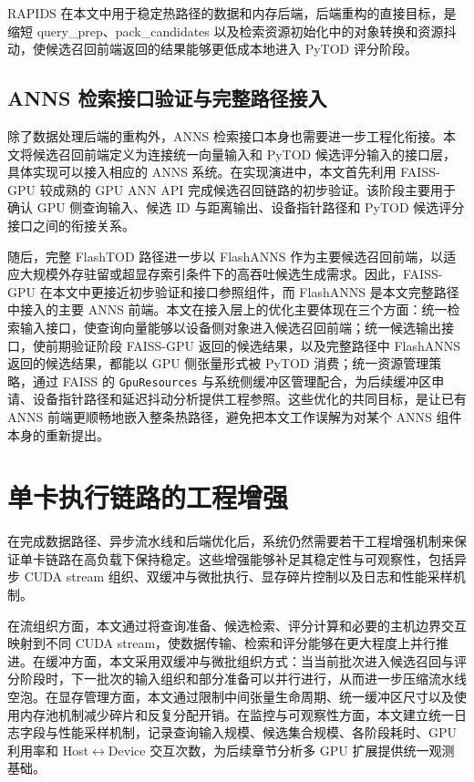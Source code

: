 RAPIDS 在本文中用于稳定热路径的数据和内存后端，后端重构的直接目标，是缩短 query\_prep、pack\_candidates 以及检索资源初始化中的对象转换和资源抖动，使候选召回前端返回的结果能够更低成本地进入 PyTOD 评分阶段。

\subsection{ANNS 检索接口验证与完整路径接入}

除了数据处理后端的重构外，ANNS 检索接口本身也需要进一步工程化衔接。本文将候选召回前端定义为连接统一向量输入和 PyTOD 候选评分输入的接口层，具体实现可以接入相应的 ANNS 系统。在实现演进中，本文首先利用 FAISS-GPU 较成熟的 GPU ANN API 完成候选召回链路的初步验证。该阶段主要用于确认 GPU 侧查询输入、候选 ID 与距离输出、设备指针路径和 PyTOD 候选评分接口之间的衔接关系。

随后，完整 FlashTOD 路径进一步以 FlashANNS 作为主要候选召回前端，以适应大规模外存驻留或超显存索引条件下的高吞吐候选生成需求。因此，FAISS-GPU 在本文中更接近初步验证和接口参照组件，而 FlashANNS 是本文完整路径中接入的主要 ANNS 前端。本文在接入层上的优化主要体现在三个方面：统一检索输入接口，使查询向量能够以设备侧对象进入候选召回前端；统一候选输出接口，使前期验证阶段 FAISS-GPU 返回的候选结果，以及完整路径中 FlashANNS 返回的候选结果，都能以 GPU 侧张量形式被 PyTOD 消费；统一资源管理策略，通过 FAISS 的 \texttt{GpuResources} 与系统侧缓冲区管理配合，为后续缓冲区申请、设备指针路径和延迟抖动分析提供工程参照\citep{faiss_gpu_wiki}。这些优化的共同目标，是让已有 ANNS 前端更顺畅地嵌入整条热路径，避免把本文工作误解为对某个 ANNS 组件本身的重新提出。

\section{单卡执行链路的工程增强}

在完成数据路径、异步流水线和后端优化后，系统仍然需要若干工程增强机制来保证单卡链路在高负载下保持稳定。这些增强能够补足其稳定性与可观察性，包括异步 CUDA stream 组织、双缓冲与微批执行、显存碎片控制以及日志和性能采样机制。

在流组织方面，本文通过将查询准备、候选检索、评分计算和必要的主机边界交互映射到不同 CUDA stream，使数据传输、检索和评分能够在更大程度上并行推进。在缓冲方面，本文采用双缓冲与微批组织方式：当当前批次进入候选召回与评分阶段时，下一批次的输入组织和部分准备可以并行进行，从而进一步压缩流水线空泡。在显存管理方面，本文通过限制中间张量生命周期、统一缓冲区尺寸以及使用内存池机制减少碎片和反复分配开销。在监控与可观察性方面，本文建立统一日志字段与性能采样机制，记录查询输入规模、候选集合规模、各阶段耗时、GPU 利用率和 Host$\leftrightarrow$Device 交互次数，为后续章节分析多 GPU 扩展提供统一观测基础。

